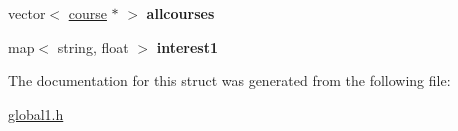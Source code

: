 \begin{DoxyCompactItemize}
\item 
\hypertarget{structUNIV_a3e60f109b557a375747bd424109431b6}{vector$<$ \hyperlink{structcourse}{course} $\ast$ $>$ {\bfseries allcourses}}\label{structUNIV_a3e60f109b557a375747bd424109431b6}

\item 
\hypertarget{structUNIV_a2066fe5f282408a1208fff6fc7512483}{map$<$ string, float $>$ {\bfseries interest1}}\label{structUNIV_a2066fe5f282408a1208fff6fc7512483}

\end{DoxyCompactItemize}


\-The documentation for this struct was generated from the following file\-:\begin{DoxyCompactItemize}
\item 
\hyperlink{global1_8h}{global1.\-h}\end{DoxyCompactItemize}
